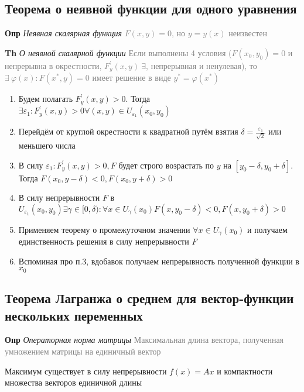 \subsection{Теорема о неявной функции для одного уравнения}

\textbf{Опр} \textit{Неявная скалярная функция}
\textcolor{gray}{$F(x, y) = 0$, но $y = y(x)$ неизвестен}

\textbf{Th} \textit{О неявной скалярной функции}
\textcolor{gray}{Если выполнены 4 условия ($F (x_0, y_0) = 0$ и непрерывна в окрестности, $F^{'}_y (x, y)~\exists$,
    непрерывная и ненулевая), то $\exists~\varphi(x): F(x^*, y) = 0$ имеет решение в виде $y^* = \varphi (x^*)$}

\begin{enumerate}
    \item Будем полагать $F^{'}_y (x, y) > 0$.
    Тогда $\exists \varepsilon_1: F^{'}_y (x, y) > 0 \forall (x, y) \in U_{\varepsilon_1}(x_0, y_0)$
    \item Перейдём от круглой окрестности к квадратной путём взятия $\delta = \frac{\varepsilon_1}{\sqrt{2}}$ или
    меньшего числа
    \item В силу $\varepsilon_1: F^{'}_y (x, y) > 0, F$ будет строго возрастать по $y$ на $[y_0 - \delta, y_0 + \delta]$.
    Тогда $F(x_0, y - \delta) < 0, F(x_0, y + \delta) > 0$
    \item В силу непрерывности $F$ в $U_{\varepsilon_1}(x_0, y_0) \exists \gamma \in [0, \delta):
    \forall x \in U_{\gamma}(x_0) F(x, y_0 - \delta) < 0, F(x, y_0 + \delta) > 0$
    \item Применяем теорему о промежуточном значении $\forall x \in U_{\gamma}(x_0)$ и получаем единственность
    решения в силу непрерывности $F$
    \item Вспоминая про п.3, вдобавок получаем непрерывность полученной функции в $x_0$
\end{enumerate}

\subsection{Теорема Лагранжа о среднем для вектор-функции нескольких переменных}

\textbf{Опр} \textit{Операторная норма матрицы}
\textcolor{gray}{Максимальная длина вектора, полученная умножением матрицы на единичный вектор}

Максимум существует в силу непрерывности $f(x) = Ax$ и компактности множества векторов единичной длины

